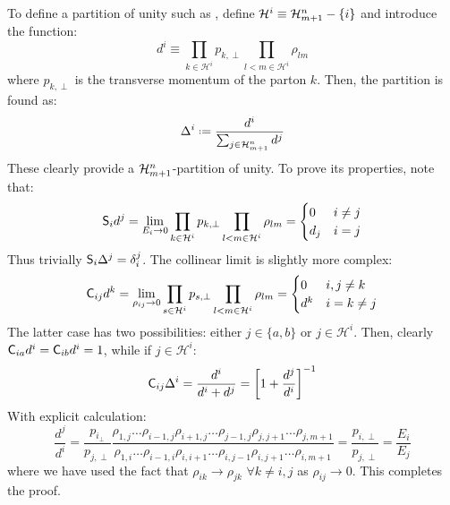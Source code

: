 To define a partition of unity such as , define $ \mathcal{H}^i \equiv \mathcal{H}^{n}_{m+1} - \{i\} $ and introduce the function:
\begin{equation}
  d^i \equiv \prod_{k \in \mathcal{H}^i} p_{k,\perp} \prod_{l < m \in \mathcal{H}^i} \rho_{lm}
\end{equation}
where $ p_{k,\perp} $ is the transverse momentum of the parton $ k $. Then, the partition is found as:
\begin{equation}
  \Delta^i \defeq \frac{d^i}{\sum_{j \in \fsu{n}{m+1}} d^j}
\end{equation}
These clearly provide a $ \mathcal{H}^{n}_{m+1} $-partition of unity. To prove its properties, note that:
\begin{equation*}
  \mathsf{S}_i d^j = \lim_{E_i \rightarrow 0} \prod_{k \in \mathcal{H}^i} p_{k,\perp} \prod_{l < m \in \mathcal{H}^i} \rho_{lm} =
  \begin{cases}
    0 & i \neq j \\
    d_j & i = j
  \end{cases}
\end{equation*}
Thus trivially $ \mathsf{S}_i \Delta^j = \delta_i^j $. The collinear limit is slightly more complex:
\begin{equation*}
  \mathsf{C}_{ij} d^k = \lim_{\rho_{ij} \rightarrow 0} \prod_{s \in \mathcal{H}^i} p_{s,\perp} \prod_{l < m \in \mathcal{H}^i} \rho_{lm} =
  \begin{cases}
    0 & i,j \neq k \\
    d^k & i = k \neq j
  \end{cases}
\end{equation*}
The latter case has two possibilities: either $ j \in \{a,b\} $ or $ j \in \mathcal{H}^i $. Then, clearly $ \mathsf{C}_{ia} d^i = \mathsf{C}_{ib} d^i = 1 $, while if $ j \in \mathcal{H}^i $:
\begin{equation*}
  \mathsf{C}_{ij} \Delta^i = \frac{d^i}{d^i + d^j} = \left[ 1 + \frac{d^j}{d^i} \right]^{-1}
\end{equation*}
With explicit calculation:
\begin{equation*}
  \frac{d^j}{d^i} = \frac{p_{i_\perp}}{p_{j,\perp}} \frac{\rho_{1,j} \dots \rho_{i-1,j} \rho_{i+1,j} \dots \rho_{j-1,j} \rho_{j,j+1} \dots \rho_{j,m+1}}{\rho_{1,i} \dots \rho_{i-1,i} \rho_{i,i+1} \dots \rho_{i,j-1} \rho_{i,j+1} \dots \rho_{i,m+1}} = \frac{p_{i,\perp}}{p_{j,\perp}} = \frac{E_i}{E_j}
\end{equation*}
where we have used the fact that $ \rho_{ik} \rightarrow \rho_{jk} \,\,\forall k \neq i,j $ as $ \rho_{ij} \rightarrow 0 $. This completes the proof.

